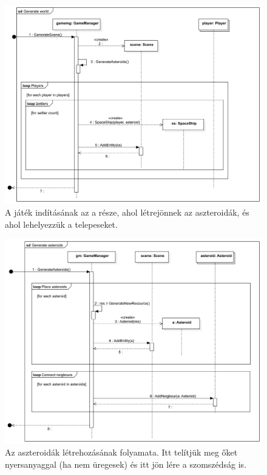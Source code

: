 \begin{figure}[H] 
\centering 
\includegraphics[width=1\textwidth]{docs/3_Project/svg/Design Model!Game Init!Generate world!Generate world_25.png} 
\caption{A játék indításának az a része, ahol létrejönnek az aszteroidák, és ahol lehelyezzük a telepeseket.} 
\end{figure} 

\begin{figure}[H] 
\centering 
\includegraphics[width=1\textwidth]{docs/3_Project/svg/Design Model!Game Init!Generate asteroids!Generate asteroids_26.png} 
\caption{Az aszteroidák létrehozásának folyamata. Itt telítjük meg őket nyersanyaggal (ha nem üregesek) és itt jön lére a szomszédság is.} 
\end{figure} 

